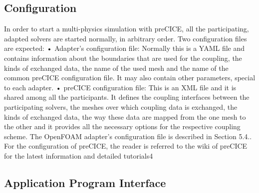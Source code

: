 \subsection{Configuration}
\label{sec:pc-config}

In order to start a multi-physics simulation with preCICE, all the participating, adapted
solvers are started normally, in arbitrary order. Two configuration files are expected:
• Adapter’s configuration file: Normally this is a YAML file and contains information
about the boundaries that are used for the coupling, the kinds of exchanged data,
the name of the used mesh and the name of the common preCICE configuration file.
It may also contain other parameters, special to each adapter.
• preCICE configuration file: This is an XML file and it is shared among all the
participants. It defines the coupling interfaces between the participating solvers, the
meshes over which coupling data is exchanged, the kinds of exchanged data, the way
these data are mapped from the one mesh to the other and it provides all the necessary
options for the respective coupling scheme.
The OpenFOAM adapter’s configuration file is described in Section 5.4.. For the configuration
of preCICE, the reader is referred to the wiki of preCICE for the latest information
and detailed tutorials4


\subsection{Application Program Interface}
\label{sec:pc-api}

